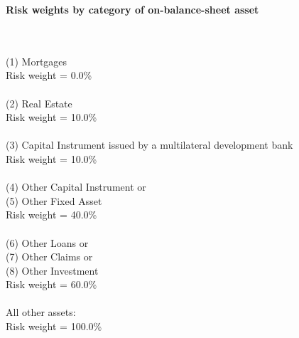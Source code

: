 \documentclass{article}
\begin{document}
\setlength{\parindent}{0em}
\begin{center}{\bf Risk weights by category of on-balance-sheet asset}\end{center}
~\\
~\\

(1) Mortgages \\
Risk weight = 0.0\%\\

~\\
(2) Real Estate\\
Risk weight = 10.0\%\\

~\\
(3) Capital Instrument issued by a multilateral development bank \\
Risk weight = 10.0\%\\

~\\
(4) Other Capital Instrument or \\
(5) Other Fixed Asset\\
Risk weight = 40.0\%\\

~\\
(6) Other Loans or \\
(7) Other Claims or \\
(8) Other Investment\\
Risk weight = 60.0\%\\

~\\
All other assets:\\
Risk weight = 100.0\%\\

~\\
\end{document}

